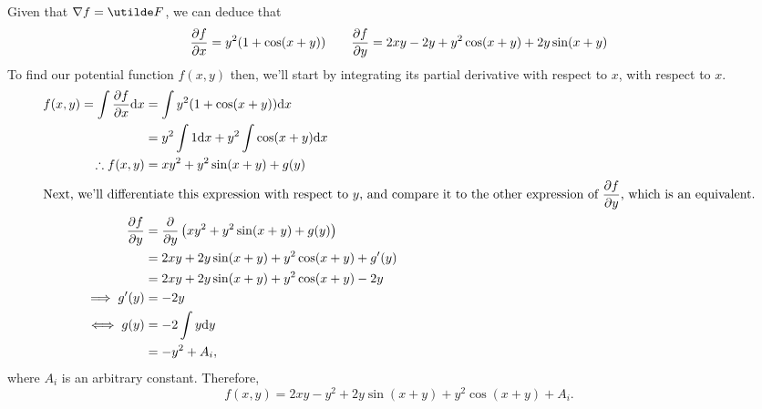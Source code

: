 \documentclass[a4paper,12pt]{report}
\begin{document}
\newpage
{}
\sol
Given that $\grad f = \ut{F}$, we can deduce that
$$
  \frac{\partial f}{\partial x} = y^2(1 + \cos(x+y))\qquad \frac{\partial f}{\partial y} = 2xy - 2y + y^2\cos(x+y) + 2y\sin(x+y)
$$
To find our potential function $f(x,y)$ then, we'll start by integrating its partial derivative with respect to $x$, with respect to $x$.
\begin{align*}
  f(x,y) = \int\frac{\partial f}{\partial x}\mathrm{d} x &= \int y^2(1 + \cos(x+y))\mathrm{d} x \\
    &= y^2 \int 1\mathrm{d} x + y^2\int\cos(x+y)\mathrm{d} x \\
  \therefore f(x,y) &= xy^2 + y^2\sin(x+y) + g(y) \\
  \intertext{Next, we'll differentiate this expression with respect to $y$, and compare it to the other expression of $\dfrac{\partial f}{\partial y}$, which is an equivalent.}
  \frac{\partial f}{\partial y} &= \frac{\partial }{\partial y}\left( xy^2 + y^2\sin(x+y) + g(y) \right) \\
    &= 2xy + 2y\sin(x+y) + y^2\cos(x+y) + g'(y) \\
    &= 2xy + 2y\sin(x+y) + y^2\cos(x+y) - 2y \\
  \implies g'(y) &= -2y \\
  \iff g(y) &= -2\int y\mathrm{d} y \\
    &= -y^2 + A_i,
\end{align*}
where $A_i$ is an arbitrary constant. Therefore,
$$
  f(x,y) = 2xy - y^2 + 2y\sin(x+y) + y^2\cos(x+y) + A_i.
$$
\end{document}

